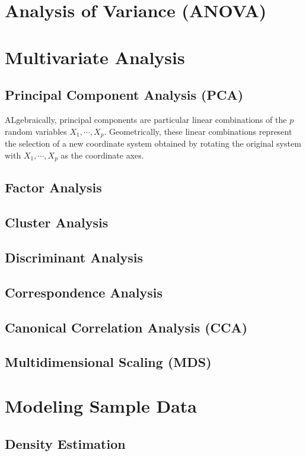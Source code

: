 \documentclass{memoir}
\begin{document}
\chapter{Analysis of Variance (ANOVA)}

\chapter{Multivariate Analysis}
\section{Principal Component Analysis (PCA)}
ALgebraically, principal components are particular linear combinations of the $p$ random variables $X_1, \cdots, X_p$. Geometrically, these linear combinations represent the selection of a new coordinate system obtained by rotating the original system with $X_1, \cdots, X_p$ as the coordinate axes.



\section{Factor Analysis}
\section{Cluster Analysis}
\section{Discriminant Analysis}
\section{Correspondence Analysis}
\section{Canonical Correlation Analysis (CCA)}
\section{Multidimensional Scaling (MDS)}

\chapter{Modeling Sample Data}
\section{Density Estimation}
\end{document}
